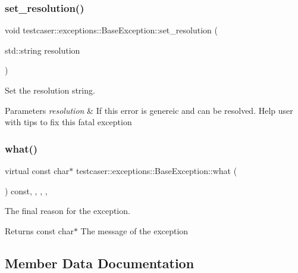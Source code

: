 \subsubsection{\texorpdfstring{set\_resolution()}{set\_resolution()}}
{\footnotesize\ttfamily void testcaser\+::exceptions\+::\+Base\+Exception\+::set\+\_\+resolution (\begin{DoxyParamCaption}\item[{std\+::string}]{resolution }\end{DoxyParamCaption})\hspace{0.3cm}{\ttfamily [inline]}}



Set the resolution string. 


\begin{DoxyParams}{Parameters}
{\em resolution} & If this error is genereic and can be resolved. Help user with tips to fix this fatal exception \\
\hline
\end{DoxyParams}
\mbox{\label{classtestcaser_1_1exceptions_1_1BaseException_a76d41683a93c7c45cd446ee161344f05}} 
\subsubsection{\texorpdfstring{what()}{what()}}
{\footnotesize\ttfamily virtual const char$\ast$ testcaser\+::exceptions\+::\+Base\+Exception\+::what (\begin{DoxyParamCaption}{ }\end{DoxyParamCaption}) const\hspace{0.3cm}{\ttfamily [inline]}, {\ttfamily [final]}, {\ttfamily [override]}, {\ttfamily [virtual]}, {\ttfamily [noexcept]}}



The final reason for the exception. 

\begin{DoxyReturn}{Returns}
const char$\ast$ The message of the exception 
\end{DoxyReturn}


\subsection{Member Data Documentation}
\mbox{\label{classtestcaser_1_1exceptions_1_1BaseException_abfc26d4451ae832886c32ad2e283104e}} 
